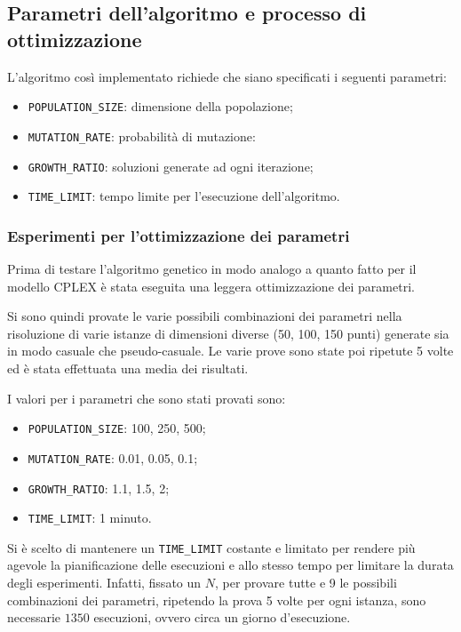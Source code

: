 \subsection{Parametri dell'algoritmo e processo di ottimizzazione}

L'algoritmo così implementato richiede che siano specificati i seguenti parametri:

\begin{itemize}
	\item\texttt{POPULATION\_SIZE}: dimensione della popolazione;
	\item\texttt{MUTATION\_RATE}: probabilità di mutazione:
	\item\texttt{GROWTH\_RATIO}: soluzioni generate ad ogni iterazione;
	\item\texttt{TIME\_LIMIT}: tempo limite per l'esecuzione dell'algoritmo.
\end{itemize}

\subsubsection{Esperimenti per l'ottimizzazione dei parametri}

Prima di testare l'algoritmo genetico in modo analogo a quanto fatto per il modello CPLEX è stata eseguita una leggera ottimizzazione dei parametri.

Si sono quindi provate le varie possibili combinazioni dei parametri nella risoluzione di varie istanze di dimensioni diverse (50, 100, 150 punti) generate sia in modo casuale che pseudo-casuale.
Le varie prove sono state poi ripetute 5 volte ed è stata effettuata una media dei risultati.

I valori per i parametri che sono stati provati sono:

\begin{itemize}
	\item \texttt{POPULATION\_SIZE}: 100, 250, 500;
	\item \texttt{MUTATION\_RATE}: 0.01, 0.05, 0.1;
	\item \texttt{GROWTH\_RATIO}: 1.1, 1.5, 2;
	\item \texttt{TIME\_LIMIT}: 1 minuto.
\end{itemize}

Si è scelto di mantenere un \texttt{TIME\_LIMIT} costante e limitato per rendere più agevole la pianificazione delle esecuzioni e allo stesso tempo per limitare la durata degli esperimenti. Infatti, fissato un $N$, per provare tutte e 9 le possibili combinazioni dei parametri, ripetendo la prova 5 volte per ogni istanza, sono necessarie $1350$ esecuzioni, ovvero circa un giorno d'esecuzione.

